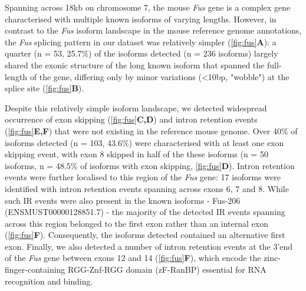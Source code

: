 Spanning across 18kb on chromosome 7, the mouse \textit{Fus} gene is a complex gene characterised with multiple known isoforms of varying lengths. However, in contrast to the \textit{Fus} isoform landscape in the mouse reference genome annotations, the \textit{Fus} splicing pattern in our dataset was relatively simpler (\cref{fig:fus}\textbf{A}): a quarter (n = 53, 25.7\%) of the isoforms detected (n = 236 isoforms) largely shared the exonic structure of the long known isoform that spanned the full-length of the gene, differing only by minor variations (<10bp, "wobble") at the splice site (\cref{fig:fus}\textbf{B}). 

Despite this relatively simple isoform landscape, we detected widespread occurrence of exon skipping (\cref{fig:fus}\textbf{C,D}) and intron retention events (\cref{fig:fus}\textbf{E,F}) that were not existing in the reference mouse genome. Over 40\% of isoforms detected (n = 103, 43.6\%) were characterised with at least one exon skipping event, with exon 8 skipped in half of the these isoforms (n = 50 isoforms, n = 48.5\% of isoforms with exon skipping, \cref{fig:fus}\textbf{D}). Intron retention events were further localised to this region of the \textit{Fus} gene: 17 isoforms were identified with intron retention events spanning across exons 6, 7 and 8. While such IR events were also present in the known isoforms - Fus-206 (ENSMUST00000128851.7) - the majority of the detected IR events spanning across this region belonged to the first exon rather than an internal exon (\cref{fig:fus}\textbf{F}). Consequently, the isoforms detected contained an alternative first exon. Finally, we also detected a number of intron retention events at the 3'end of the \textit{Fus} gene between exons 12 and 14 (\cref{fig:fus}\textbf{F}), which encode the zinc-finger-containing RGG-Znf-RGG domain (zF-RanBP) essential for RNA recognition and binding\cite{Wang2015c}. 

